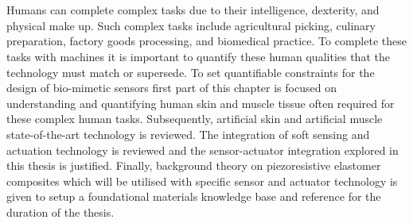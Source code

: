 \chapter{\chapiiname}
\label{chapter2}
Humans can complete complex tasks due to their intelligence, dexterity, and physical make up. Such complex tasks include agricultural picking, culinary preparation, factory goods processing, and biomedical practice. To complete these tasks with machines it is important to quantify these human qualities that the technology must match or supersede. To set quantifiable constraints for the design of bio-mimetic sensors first part of this chapter is focused on understanding and quantifying human skin and muscle tissue often required for these complex human tasks. Subsequently, artificial skin and artificial muscle state-of-the-art technology is reviewed. The integration of soft sensing and actuation technology is reviewed and the sensor-actuator integration explored in this thesis is justified. Finally, background theory on piezoresistive elastomer composites which will be utilised with specific sensor and actuator technology is given to setup a foundational materials knowledge base and reference for the duration of the thesis.



